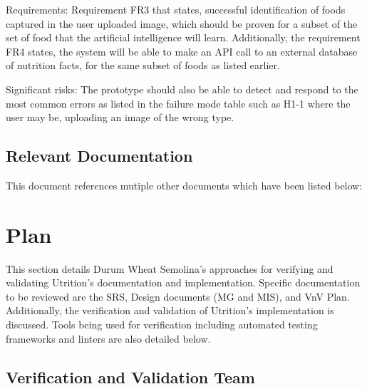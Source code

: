 \documentclass[12pt, titlepage]{article}
\begin{document}
		Requirements: Requirement FR3 that states, successful identification of foods captured in the user uploaded image, which should be proven for a subset of the set of food that the artificial intelligence will learn. Additionally, the requirement FR4 states, the system will be able to make an API call to an external database of nutrition facts, for the same subset of foods as listed earlier.  

		Significant risks: The prototype should also be able to detect and respond to the most common errors as listed in the failure mode table such as H1-1 where the user may be, uploading an image of the wrong type.  
	
	\subsection{Relevant Documentation}
	

		This document references mutiple other documents which have been listed below:
	
	\citet{SRS}
	\citet{DevelopmentPlan}
	\citet{MG}
	\citet{MIS}

	
	
	\section{Plan}
	
	This section details Durum Wheat Semolina's approaches for verifying and validating Utrition's documentation and implementation. Specific documentation to be reviewed are the SRS, Design documents (MG and MIS), and VnV Plan. Additionally, the verification and validation of Utrition's implementation is discussed. Tools being used for verification including automated testing frameworks and linters are also detailed below.
	
	\subsection{Verification and Validation Team}
	
	
\end{document}

